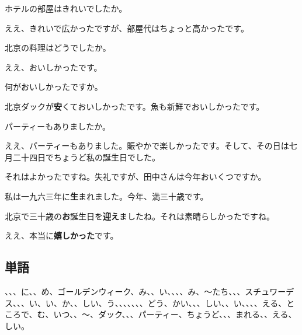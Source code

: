 \documentclass[a5j]{ltjtarticle}
\newcommand*{\LiSpeaks}{\item[李]}
\newcommand*{\TanakaSpeaks}{\item[田中]}
\begin{document}
\begin{dialogue}
  \LiSpeaks
  ホテルの部屋はきれいでしたか。
  \TanakaSpeaks
  ええ、きれいで広かったですが、部屋代はちょっと高かったです。
  \LiSpeaks
  北京の料理はどうでしたか。
  \TanakaSpeaks
  ええ、おいしかったです。
  \LiSpeaks
  何がおいしかったですか。
  \TanakaSpeaks
  北京ダックが\textbf{安}くておいしかったです。魚も新鮮でおいしかったです。
  \LiSpeaks
  パーティーもありましたか。
  \TanakaSpeaks
  ええ、パーティーもありました。賑やかで楽しかったです。そして、その日は七月二十四日でちょうど私の誕生日でした。
  \LiSpeaks
  それはよかったですね。失礼ですが、田中さんは今年おいくつですか。
  \TanakaSpeaks
  私は一九六三年に\textbf{生}まれました。今年、満三十歳です。
  \LiSpeaks
  北京で三十歳の\textbf{お}誕生日を\textbf{迎え}ましたね。それは素晴らしかったですね。
  \TanakaSpeaks
  ええ、本当に\textbf{嬉しかった}です。
\end{dialogue}

\subsection*{単語}

\begin{onehalfspace}
  、、、に、、め、ゴールデンウィーク、み、、い、、、、み、〜たち、、、スチュワーデス、、、い、い、か、、しい、う、、、、、、、どう、かい、、、しい、、い、、、、える、ところで、む、いつ、、〜、ダック、、、パーティー、ちょうど、、、まれる、、える、しい。
\end{onehalfspace}
\end{document}
